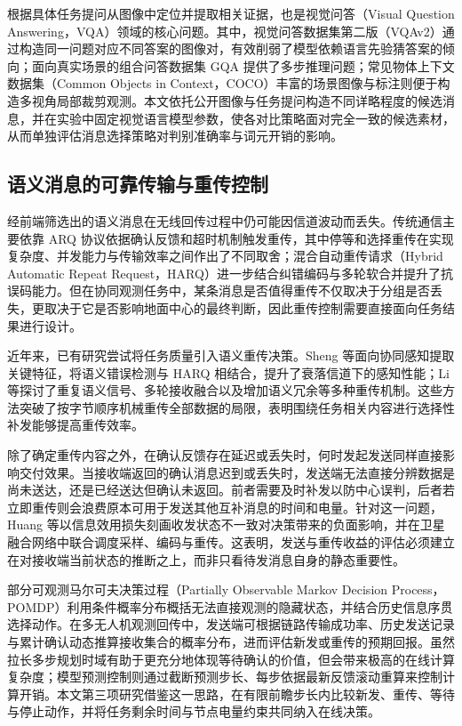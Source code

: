 根据具体任务提问从图像中定位并提取相关证据，也是视觉问答（Visual Question Answering，VQA）领域的核心问题\cite{where-to-look-vqa}。其中，视觉问答数据集第二版（VQAv2）通过构造同一问题对应不同答案的图像对，有效削弱了模型依赖语言先验猜答案的倾向\cite{vqa-v2}；面向真实场景的组合问答数据集 GQA 提供了多步推理问题\cite{gqa}；常见物体上下文数据集（Common Objects in Context，COCO）丰富的场景图像与标注则便于构造多视角局部裁剪观测\cite{coco}。本文依托公开图像与任务提问构造不同详略程度的候选消息，并在实验中固定视觉语言模型参数，使各对比策略面对完全一致的候选素材，从而单独评估消息选择策略对判别准确率与词元开销的影响。

\subsection{语义消息的可靠传输与重传控制}

经前端筛选出的语义消息在无线回传过程中仍可能因信道波动而丢失。传统通信主要依靠 ARQ 协议依据确认反馈和超时机制触发重传，其中停等和选择重传在实现复杂度、并发能力与传输效率之间作出了不同取舍\cite{lin1984arq}；混合自动重传请求（Hybrid Automatic Repeat Request，HARQ）进一步结合纠错编码与多轮软合并提升了抗误码能力。但在协同观测任务中，某条消息是否值得重传不仅取决于分组是否丢失，更取决于它是否影响地面中心的最终判断，因此重传控制需要直接面向任务结果进行设计。

近年来，已有研究尝试将任务质量引入语义重传决策。Sheng 等面向协同感知提取关键特征，将语义错误检测与 HARQ 相结合，提升了衰落信道下的感知性能\cite{sheng2024harq}；Li 等探讨了重复语义信号、多轮接收融合以及增加语义冗余等多种重传机制\cite{li2025semharq}。这些方法突破了按字节顺序机械重传全部数据的局限，表明围绕任务相关内容进行选择性补发能够提高重传效率。

除了确定重传内容之外，在确认反馈存在延迟或丢失时，何时发起发送同样直接影响交付效果。当接收端返回的确认消息迟到或丢失时，发送端无法直接分辨数据是尚未送达，还是已经送达但确认未返回。前者需要及时补发以防中心误判，后者若立即重传则会浪费原本可用于发送其他互补消息的时间和电量。针对这一问题，Huang 等以信息效用损失刻画收发状态不一致对决策带来的负面影响，并在卫星融合网络中联合调度采样、编码与重传\cite{uoi2024satellite}。这表明，发送与重传收益的评估必须建立在对接收端当前状态的推断之上，而非只看待发消息自身的静态重要性。

部分可观测马尔可夫决策过程（Partially Observable Markov Decision Process，POMDP）利用条件概率分布概括无法直接观测的隐藏状态，并结合历史信息序贯选择动作\cite{kaelbling1998pomdp}。在多无人机观测回传中，发送端可根据链路传输成功率、历史发送记录与累计确认动态推算接收集合的概率分布，进而评估新发或重传的预期回报。虽然拉长多步规划时域有助于更充分地体现等待确认的价值，但会带来极高的在线计算复杂度；模型预测控制则通过截断预测步长、每步依据最新反馈滚动重算来控制计算开销\cite{mayne2000mpc}。本文第三项研究借鉴这一思路，在有限前瞻步长内比较新发、重传、等待与停止动作，并将任务剩余时间与节点电量约束共同纳入在线决策。

